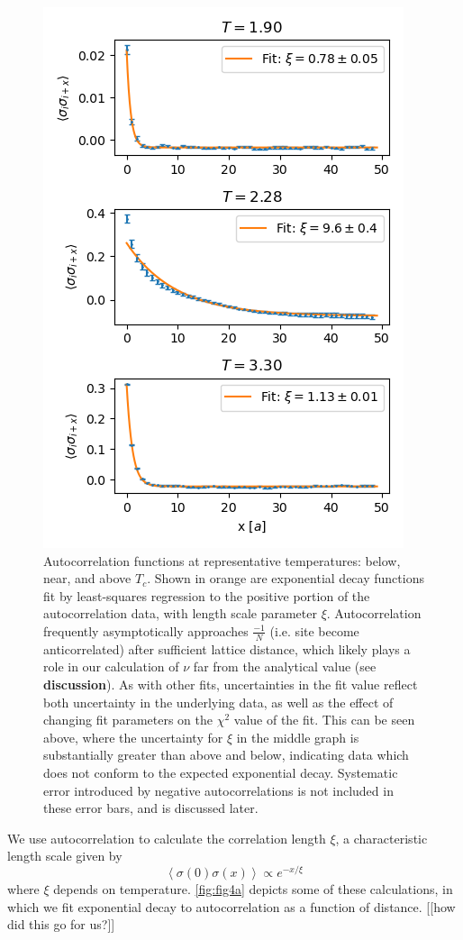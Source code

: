 \documentclass[letter,scriptaddress,twocolumn, prl,nofootinbib]{revtex4}
\newcommand{\submin}[1]{\left\langle #1 \right\rangle}
\begin{document}
\begin{figure}[h]
	\begin{center}
		\includegraphics[width=.5\textwidth]{figs/fig4_autocors.png}
		\caption{Autocorrelation functions at representative temperatures: below, near, and above $T_c$. Shown in orange are exponential decay functions fit by least-squares regression to the positive portion of the autocorrelation data, with length scale parameter $\xi$. Autocorrelation frequently asymptotically approaches $\frac{-1}{N}$ (i.e. site become anticorrelated) after sufficient lattice distance, which likely plays a role in our calculation of $\nu$ far from the analytical value (see \textbf{discussion}). As with other fits, uncertainties in the fit value reflect both uncertainty in the underlying data, as well as the effect of changing fit parameters on the $\chi^2$ value of the fit. This can be seen above, where the uncertainty for $\xi$ in the middle graph is substantially greater than above and below, indicating data which does not conform to the expected exponential decay. Systematic error introduced by negative autocorrelations is not included in these error bars, and is discussed later.}
		\label{fig:fig4a}
	\end{center}
\end{figure}

We use autocorrelation to calculate the correlation length $\xi$, a characteristic length scale given by
\begin{equation}
	\label{eq:xi}
	\submin{\sigma(0)\sigma(x)} \propto e^{-x/\xi}
\end{equation}
where $\xi$ depends on temperature. \autoref{fig:fig4a} depicts some of these calculations, in which we fit exponential decay to autocorrelation as a function of distance. [[how did this go for us?]]
\end{document}
